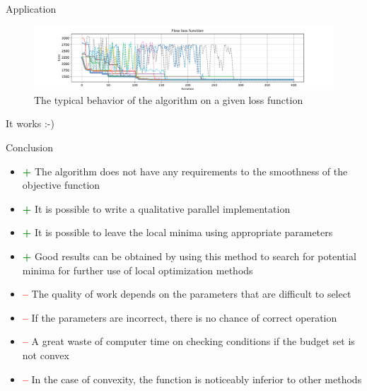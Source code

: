 \documentclass[final,hyperref]{beamer}
\begin{document}
\begin{frame}[t]
\begin{columns}[t]
\begin{column}{.465\textwidth}
\begin{block}{Application}
	
	\begin{figure}[H]
		\includegraphics[width=1.0\linewidth]{flow_tr.pdf}
		\caption{The typical behavior of the algorithm on a given loss function}
	\end{figure}
	It works :-)

\end{block}


\begin{block}{Conclusion}

\begin{itemize}
	\item 
		\textcolor{green}{\textbf{+}} The algorithm does not have any requirements to the smoothness
						of the objective function
	\item	
		\textcolor{green}{\textbf{+}} It is possible to write a qualitative parallel implementation
	\item	
		\textcolor{green}{\textbf{+}} It is possible to leave the local minima using appropriate parameters
	\item
		\textcolor{green}{\textbf{+}} Good results can be obtained by using this method to search 
						for potential minima for further use of local optimization methods


	\item
		\textcolor{red}{\textbf{--}} The quality of work depends on the parameters that are difficult to select
	\item
		\textcolor{red}{\textbf{--}} If the parameters are incorrect, there is no chance of correct operation
	\item
		\textcolor{red}{\textbf{--}} A great waste of computer time on checking conditions if the budget set is not convex
	\item
		\textcolor{red}{\textbf{--}} In the case of convexity, the function is noticeably inferior to other methods

\end{itemize}

\end{block}


\end{column}
\end{columns}
\end{frame}
\end{document}
